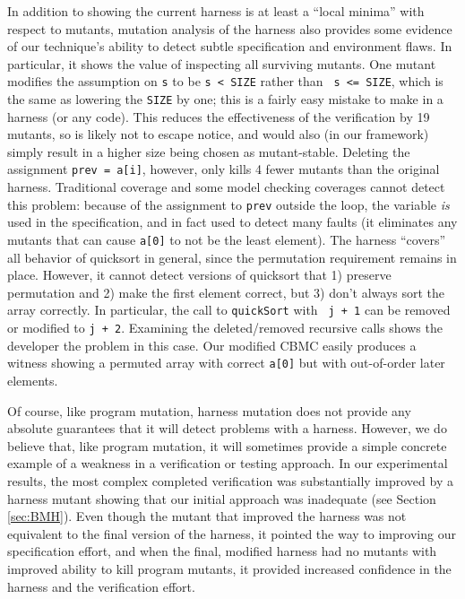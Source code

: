 \documentclass{svjour3}
\begin{document}
In addition to showing the current harness is at least a ``local
minima'' with respect to mutants, mutation analysis of the harness
also provides some evidence of our technique's ability to detect
subtle specification and environment flaws.  In particular, it shows
the value of inspecting all surviving mutants.  One mutant
modifies the assumption on {\tt s} to be {\tt s < SIZE} rather than {\tt
s <= SIZE}, which is the same as lowering the {\tt SIZE} by one; this
is a fairly easy mistake to make in a harness (or any code).  This reduces the
effectiveness of the verification by 19 mutants, so is likely not to
escape notice, and would also (in our framework) simply result in a
higher size being chosen as mutant-stable.  Deleting the assignment
{\tt prev = a[i]}, however, only kills 4 fewer mutants than the
original harness.  Traditional coverage and some model checking coverages
cannot detect this problem: because of the assignment to {\tt prev}
outside the loop, the variable \emph{is} used in the specification, and in
fact used to detect many faults (it eliminates any mutants that can
cause {\tt a[0]} to not be the least element).  The harness ``covers'' all behavior of quicksort in general, since
the permutation requirement remains in place.  However, it cannot
detect versions of quicksort that 1) preserve permutation and 2) make
the first element correct, but 3) don't always sort the
array correctly.  In particular, the call to {\tt quickSort} with {\tt
  j + 1} can be removed or modified to {\tt j + 2}.
Examining the deleted/removed recursive calls shows the developer
the problem in this case.  Our modified CBMC easily produces a witness showing a permuted array with correct
{\tt a[0]} but with out-of-order later elements.

Of course, like program mutation, harness mutation does not provide
any absolute guarantees that it will detect problems with a harness.
However, we do believe that, like program mutation, it will sometimes
provide a simple concrete example of a weakness in a verification or
testing approach.  In our experimental results, the most complex
completed verification was substantially improved by a harness mutant
showing that our initial approach was inadequate (see Section
\ref{sec:BMH}).  Even though the mutant that improved the harness was
not equivalent to the final version of the harness, it pointed the way
to improving our specification effort, and when the final, modified
harness had no mutants with improved ability to kill program mutants, it
provided increased confidence in the harness and the verification
effort.
\end{document}
